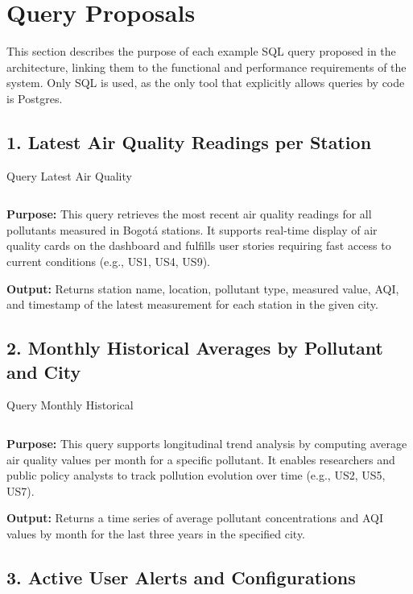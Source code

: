 \section{Query Proposals}

This section describes the purpose of each example SQL query proposed in the architecture, linking them to the functional and performance requirements of the system. Only SQL is used, as the only tool that explicitly allows queries by code is Postgres.

\subsection*{1. Latest Air Quality Readings per Station}

\begin{listing}[H]
\caption{Query Latest Air Quality}
\label{code:query1}
\inputminted[linenos]{sql}{Codigos/query_1.tex}
\end{listing}

\textbf{Purpose:} This query retrieves the most recent air quality readings for all pollutants measured in Bogotá stations. It supports real-time display of air quality cards on the dashboard and fulfills user stories requiring fast access to current conditions (e.g., US1, US4, US9).

\textbf{Output:} Returns station name, location, pollutant type, measured value, AQI, and timestamp of the latest measurement for each station in the given city.

\subsection*{2. Monthly Historical Averages by Pollutant and City}

\begin{listing}[H]
\caption{Query Monthly Historical}
\label{code:query2}
\inputminted[linenos]{sql}{Codigos/query_2.tex}
\end{listing}

\textbf{Purpose:} This query supports longitudinal trend analysis by computing average air quality values per month for a specific pollutant. It enables researchers and public policy analysts to track pollution evolution over time (e.g., US2, US5, US7).

\textbf{Output:} Returns a time series of average pollutant concentrations and AQI values by month for the last three years in the specified city.

\subsection*{3. Active User Alerts and Configurations}

